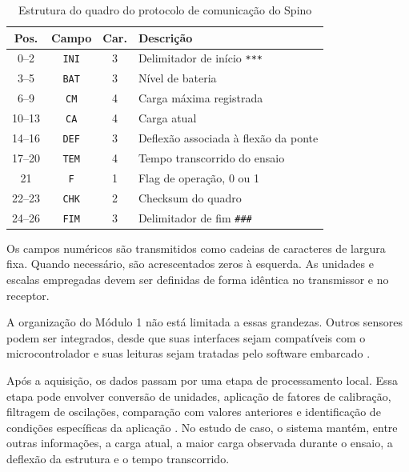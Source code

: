 \documentclass[conference]{IEEEtran}
\begin{document}
\begin{table}[htbp]
    \caption{Estrutura do quadro do protocolo de comunicação
    do Spino}
    \label{tab:protocolo}
    \centering
    \footnotesize
    \renewcommand{\arraystretch}{1.05}
    \begin{tabular}{|c|c|c|p{3.25cm}|}
        \hline
        \textbf{Pos.} &
        \textbf{Campo} &
        \textbf{Car.} &
        \textbf{Descrição} \\
        \hline
        0--2 & \texttt{INI} & 3 &
        Delimitador de início \texttt{***} \\
        \hline
        3--5 & \texttt{BAT} & 3 &
        Nível de bateria \\
        \hline
        6--9 & \texttt{CM} & 4 &
        Carga máxima registrada \\
        \hline
        10--13 & \texttt{CA} & 4 &
        Carga atual \\
        \hline
        14--16 & \texttt{DEF} & 3 &
        Deflexão associada à flexão da ponte \\
        \hline
        17--20 & \texttt{TEM} & 4 &
        Tempo transcorrido do ensaio \\
        \hline
        21 & \texttt{F} & 1 &
        Flag de operação, 0 ou 1 \\
        \hline
        22--23 & \texttt{CHK} & 2 &
        Checksum do quadro \\
        \hline
        24--26 & \texttt{FIM} & 3 &
        Delimitador de fim \texttt{\#\#\#} \\
        \hline
    \end{tabular}

    \vspace{0.1cm}
    \parbox{0.98\columnwidth}{
        \footnotesize
        Os campos numéricos são transmitidos como cadeias de
        caracteres de largura fixa. Quando necessário, são
        acrescentados zeros à esquerda. As unidades e escalas
        empregadas devem ser definidas de forma idêntica no
        transmissor e no receptor.
    }
\end{table}

A organização do Módulo 1 não está limitada a essas grandezas.
Outros sensores podem ser integrados, desde que suas interfaces
sejam compatíveis com o microcontrolador e suas leituras sejam
tratadas pelo software embarcado
\cite{vidalpardo2018,njoku2025}.

Após a aquisição, os dados passam por uma etapa de processamento
local. Essa etapa pode envolver conversão de unidades, aplicação
de fatores de calibração, filtragem de oscilações, comparação com
valores anteriores e identificação de condições específicas da
aplicação \cite{vidalpardo2018,njoku2025}. No estudo de caso, o
sistema mantém, entre outras informações, a carga atual, a maior
carga observada durante o ensaio, a deflexão da estrutura e o
tempo transcorrido.
\end{document}
